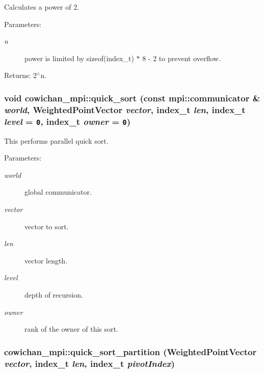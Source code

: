 Calculates a power of 2. \begin{Desc}
\item[Parameters:]
\begin{description}
\item[{\em n}]power is limited by sizeof(index\_\-t) $\ast$ 8 - 2 to prevent overflow. \end{description}
\end{Desc}
\begin{Desc}
\item[Returns:]2$^\wedge$n. \end{Desc}
\hypertarget{namespacecowichan__mpi_4ab537d0df99e9011b206c7259e82d35}{
\subsubsection[{quick\_\-sort}]{\setlength{\rightskip}{0pt plus 5cm}void cowichan\_\-mpi::quick\_\-sort (const mpi::communicator \& {\em world}, \/  {\bf WeightedPointVector} {\em vector}, \/  {\bf index\_\-t} {\em len}, \/  {\bf index\_\-t} {\em level} = {\tt 0}, \/  {\bf index\_\-t} {\em owner} = {\tt 0})}}
\label{namespacecowichan__mpi_4ab537d0df99e9011b206c7259e82d35}


This performs parallel quick sort. \begin{Desc}
\item[Parameters:]
\begin{description}
\item[{\em world}]global communicator. \item[{\em vector}]vector to sort. \item[{\em len}]vector length. \item[{\em level}]depth of recursion. \item[{\em owner}]rank of the owner of this sort. \end{description}
\end{Desc}
\hypertarget{namespacecowichan__mpi_83904b95f448398ff15331182ee0c007}{
\subsubsection[{quick\_\-sort\_\-partition}]{ cowichan\_\-mpi::quick\_\-sort\_\-partition ({\bf WeightedPointVector} {\em vector}, \/  {\bf index\_\-t} {\em len}, \/  {\bf index\_\-t} {\em pivotIndex})}}
\label{namespacecowichan__mpi_83904b95f448398ff15331182ee0c007}


